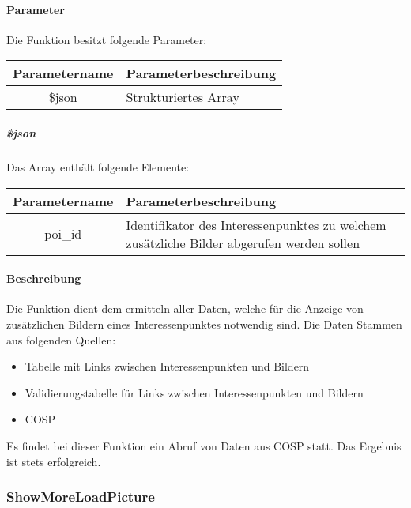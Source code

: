 \paragraph{Parameter} Die Funktion besitzt folgende Parameter:
\begin{table}[H]
	\begin{tabular}{|c|p{11cm}|}
		\hline
		\textbf{Parametername} & \textbf{Parameterbeschreibung} \\ \hline
		\$json & Strukturiertes Array \\ \hline
	\end{tabular}
\end{table}
\subparagraph{\$json}Das Array enthält folgende Elemente:
\begin{table}[H]
	\begin{tabular}{|c|p{11cm}|}
		\hline
		\textbf{Parametername} & \textbf{Parameterbeschreibung} \\ \hline
		poi\_id & Identifikator des Interessenpunktes zu welchem zusätzliche Bilder abgerufen werden sollen \\ \hline
	\end{tabular}
\end{table}
\paragraph{Beschreibung} Die Funktion dient dem ermitteln aller Daten, welche für die Anzeige von zusätzlichen Bildern eines Interessenpunktes notwendig sind. Die Daten Stammen aus folgenden Quellen:
\begin{itemize}
	\item Tabelle mit Links zwischen Interessenpunkten und Bildern
	\item Validierungstabelle für Links zwischen Interessenpunkten und Bildern
	\item COSP
\end{itemize}
Es findet bei dieser Funktion ein Abruf von Daten aus {\glqq COSP\grqq} statt. Das Ergebnis ist stets erfolgreich.
\subsubsection{ShowMoreLoadPicture}
